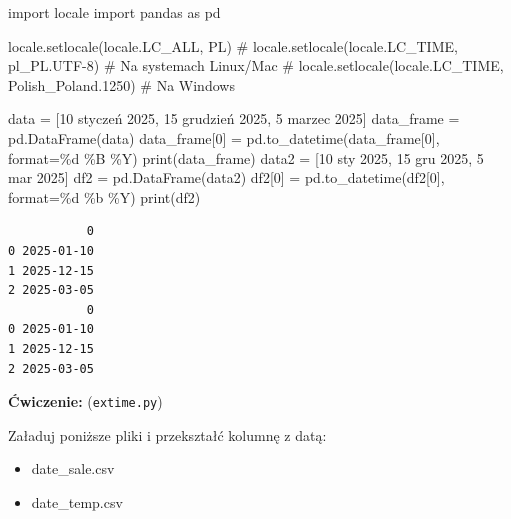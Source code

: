 \documentclass[
  polish,
  letterpaper,
  DIV=11,
  numbers=noendperiod]{scrreprt}
\newenvironment{Shaded}{\begin{snugshade}}{\end{snugshade}}
\newcommand{\BuiltInTok}[1]{\textcolor[rgb]{0.00,0.23,0.31}{#1}}
\newcommand{\CommentTok}[1]{\textcolor[rgb]{0.37,0.37,0.37}{#1}}
\newcommand{\DecValTok}[1]{\textcolor[rgb]{0.68,0.00,0.00}{#1}}
\newcommand{\ImportTok}[1]{\textcolor[rgb]{0.00,0.46,0.62}{#1}}
\newcommand{\NormalTok}[1]{\textcolor[rgb]{0.00,0.23,0.31}{#1}}
\newcommand{\OperatorTok}[1]{\textcolor[rgb]{0.37,0.37,0.37}{#1}}
\newcommand{\SpecialCharTok}[1]{\textcolor[rgb]{0.37,0.37,0.37}{#1}}
\newcommand{\StringTok}[1]{\textcolor[rgb]{0.13,0.47,0.30}{#1}}
\begin{document}
\begin{Shaded}
\begin{Highlighting}[]
\ImportTok{import}\NormalTok{ locale}
\ImportTok{import}\NormalTok{ pandas }\ImportTok{as}\NormalTok{ pd}

\NormalTok{locale.setlocale(locale.LC\_ALL, }\StringTok{\textquotesingle{}PL\textquotesingle{}}\NormalTok{)}
\CommentTok{\# locale.setlocale(locale.LC\_TIME, \textquotesingle{}pl\_PL.UTF{-}8\textquotesingle{})  \# Na systemach Linux/Mac}
\CommentTok{\# locale.setlocale(locale.LC\_TIME, \textquotesingle{}Polish\_Poland.1250\textquotesingle{})  \# Na Windows}

\NormalTok{data }\OperatorTok{=}\NormalTok{ [}\StringTok{\textquotesingle{}10 styczeń 2025\textquotesingle{}}\NormalTok{, }\StringTok{\textquotesingle{}15 grudzień 2025\textquotesingle{}}\NormalTok{, }\StringTok{\textquotesingle{}5 marzec 2025\textquotesingle{}}\NormalTok{]}
\NormalTok{data\_frame }\OperatorTok{=}\NormalTok{ pd.DataFrame(data)}
\NormalTok{data\_frame[}\DecValTok{0}\NormalTok{] }\OperatorTok{=}\NormalTok{ pd.to\_datetime(data\_frame[}\DecValTok{0}\NormalTok{], }\BuiltInTok{format}\OperatorTok{=}\StringTok{\textquotesingle{}}\SpecialCharTok{\%d}\StringTok{ \%B \%Y\textquotesingle{}}\NormalTok{)}
\BuiltInTok{print}\NormalTok{(data\_frame)}
\NormalTok{data2 }\OperatorTok{=}\NormalTok{ [}\StringTok{\textquotesingle{}10 sty 2025\textquotesingle{}}\NormalTok{, }\StringTok{\textquotesingle{}15 gru 2025\textquotesingle{}}\NormalTok{, }\StringTok{\textquotesingle{}5 mar 2025\textquotesingle{}}\NormalTok{]}
\NormalTok{df2 }\OperatorTok{=}\NormalTok{ pd.DataFrame(data2)}
\NormalTok{df2[}\DecValTok{0}\NormalTok{] }\OperatorTok{=}\NormalTok{ pd.to\_datetime(df2[}\DecValTok{0}\NormalTok{], }\BuiltInTok{format}\OperatorTok{=}\StringTok{\textquotesingle{}}\SpecialCharTok{\%d}\StringTok{ \%b \%Y\textquotesingle{}}\NormalTok{)}
\BuiltInTok{print}\NormalTok{(df2)}
\end{Highlighting}
\end{Shaded}

\begin{verbatim}
           0
0 2025-01-10
1 2025-12-15
2 2025-03-05
           0
0 2025-01-10
1 2025-12-15
2 2025-03-05
\end{verbatim}

\textbf{Ćwiczenie:} (\texttt{extime.py})

Załaduj poniższe pliki i przekształć kolumnę z datą:

\begin{itemize}
\item
  date\_sale.csv
\item
  date\_temp.csv
\end{itemize}
\end{document}
